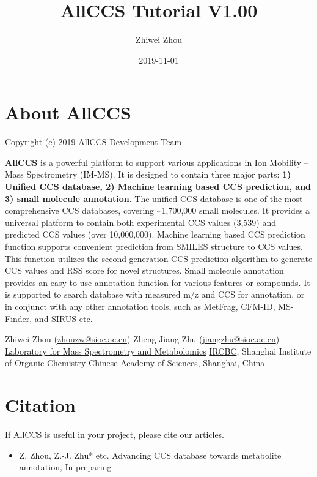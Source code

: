 \documentclass[12pt,]{book}
\title{AllCCS Tutorial V1.00}
\author{Zhiwei Zhou}
\date{2019-11-01}
\providecommand{\tightlist}{%
  \setlength{\itemsep}{0pt}\setlength{\parskip}{0pt}}
\theoremstyle{definition}
\theoremstyle{definition}
\theoremstyle{definition}
\theoremstyle{remark}
\begin{document}
\maketitle

{
\hypersetup{linkcolor=black}
\setcounter{tocdepth}{1}
\tableofcontents
}
\listoftables
\listoffigures
\chapter*{About AllCCS}\label{about-allccs}

Copyright (c) 2019 AllCCS Development Team

\href{http://allccs.zhulab.cn/}{\textbf{AllCCS}} is a powerful platform
to support various applications in Ion Mobility -- Mass Spectrometry
(IM-MS). It is designed to contain three major parts: \textbf{1) Unified
CCS database, 2) Machine learning based CCS prediction, and 3) small
molecule annotation}. The unified CCS database is one of the most
comprehensive CCS databases, covering \textasciitilde{}1,700,000 small
molecules. It provides a universal platform to contain both experimental
CCS values (3,539) and predicted CCS values (over 10,000,000). Machine
learning based CCS prediction function supports convenient prediction
from SMILES structure to CCS values. This function utilizes the second
generation CCS prediction algorithm to generate CCS values and RSS score
for novel structures. Small molecule annotation provides an easy-to-use
annotation function for various features or compounds. It is supported
to search database with measured m/z and CCS for annotation, or in
conjunct with any other annotation tools, such as MetFrag, CFM-ID,
MS-Finder, and SIRUS etc.

Zhiwei Zhou (\url{zhouzw@sioc.ac.cn}) Zheng-Jiang Zhu
(\url{jiangzhu@sioc.ac.cn}) \href{http://www.zhulab.cn/}{Laboratory for
Mass Spectrometry and Metabolomics}
\href{http://www.ircbc.ac.cn/}{IRCBC}, Shanghai Institute of Organic
Chemistry Chinese Academy of Sciences, Shanghai, China

\chapter*{Citation}\label{citation}

If AllCCS is useful in your project, please cite our articles.

\begin{itemize}
\tightlist
\item
  Z. Zhou, Z.-J. Zhu* etc. Advancing CCS database towards metabolite
  annotation, In preparing
\end{itemize}
\end{document}
